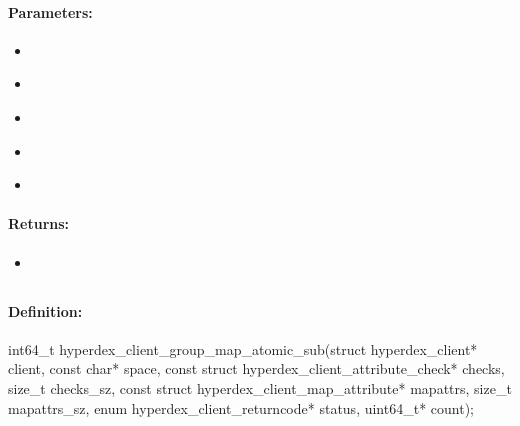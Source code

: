 \paragraph{Parameters:}
\begin{itemize}[noitemsep]
\item {}\\

\item {}\\

\item {}\\

\item {}\\

\item {}\\

\end{itemize}

\paragraph{Returns:}
\begin{itemize}[noitemsep]
\item {}\\

\end{itemize}

\pagebreak
\subsection{}
\label{api:c:group_map_atomic_sub}


\paragraph{Definition:}
\begin{ccode}
int64_t hyperdex_client_group_map_atomic_sub(struct hyperdex_client* client,
        const char* space,
        const struct hyperdex_client_attribute_check* checks, size_t checks_sz,
        const struct hyperdex_client_map_attribute* mapattrs, size_t mapattrs_sz,
        enum hyperdex_client_returncode* status,
        uint64_t* count);
\end{ccode}

